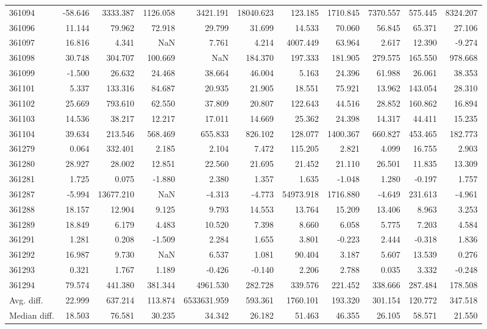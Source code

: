\begin{tabular}{lrrrrrrrrrr}
361094 & -58.646 & 3333.387 & 1126.058 & 3421.191 & 18040.623 & 123.185 & 1710.845 & 7370.557 & 575.445 & 8324.207 \\
361096 & 11.144 & 79.962 & 72.918 & 29.799 & 31.699 & 14.533 & 70.060 & 56.845 & 65.371 & 27.106 \\
361097 & 16.816 & 4.341 & NaN & 7.761 & 4.214 & 4007.449 & 63.964 & 2.617 & 12.390 & -9.274 \\
361098 & 30.748 & 304.707 & 100.669 & NaN & 184.370 & 197.333 & 181.905 & 279.575 & 165.550 & 978.668 \\
361099 & -1.500 & 26.632 & 24.468 & 38.664 & 46.004 & 5.163 & 24.396 & 61.988 & 26.061 & 38.353 \\
361101 & 5.337 & 133.316 & 84.687 & 20.935 & 21.905 & 18.551 & 75.921 & 13.962 & 143.054 & 28.310 \\
361102 & 25.669 & 793.610 & 62.550 & 37.809 & 20.807 & 122.643 & 44.516 & 28.852 & 160.862 & 16.894 \\
361103 & 14.536 & 38.217 & 12.217 & 17.011 & 14.669 & 25.362 & 24.398 & 14.317 & 44.411 & 15.235 \\
361104 & 39.634 & 213.546 & 568.469 & 655.833 & 826.102 & 128.077 & 1400.367 & 660.827 & 453.465 & 182.773 \\
361279 & 0.064 & 332.401 & 2.185 & 2.104 & 7.472 & 115.205 & 2.821 & 4.099 & 16.755 & 2.903 \\
361280 & 28.927 & 28.002 & 12.851 & 22.560 & 21.695 & 21.452 & 21.110 & 26.501 & 11.835 & 13.309 \\
361281 & 1.725 & 0.075 & -1.880 & 2.380 & 1.357 & 1.635 & -1.048 & 1.280 & -0.197 & 1.757 \\
361287 & -5.994 & 13677.210 & NaN & -4.313 & -4.773 & 54973.918 & 1716.880 & -4.649 & 231.613 & -4.961 \\
361288 & 18.157 & 12.904 & 9.125 & 9.793 & 14.553 & 13.764 & 15.209 & 13.406 & 8.963 & 3.253 \\
361289 & 18.849 & 6.179 & 4.483 & 10.520 & 7.398 & 8.660 & 6.058 & 5.775 & 7.203 & 4.584 \\
361291 & 1.281 & 0.208 & -1.509 & 2.284 & 1.655 & 3.801 & -0.223 & 2.444 & -0.318 & 1.836 \\
361292 & 16.987 & 9.730 & NaN & 6.537 & 1.081 & 90.404 & 3.187 & 5.607 & 13.539 & 0.276 \\
361293 & 0.321 & 1.767 & 1.189 & -0.426 & -0.140 & 2.206 & 2.788 & 0.035 & 3.332 & -0.248 \\
361294 & 79.574 & 441.380 & 381.344 & 4961.530 & 282.728 & 339.576 & 221.452 & 338.666 & 287.484 & 178.508 \\
Avg. diff. & 22.999 & 637.214 & 113.874 & 6533631.959 & 593.361 & 1760.101 & 193.320 & 301.154 & 120.772 & 347.518 \\
Median diff. & 18.503 & 76.581 & 30.235 & 34.342 & 26.182 & 51.463 & 46.355 & 26.105 & 58.571 & 21.550 \\
\bottomrule
\end{tabular}
